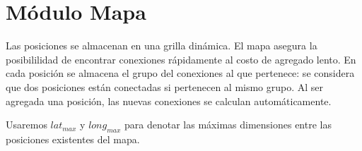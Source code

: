 \newcommand\compmatriz{lat_{max} \times long_{max}}

\section{Módulo Mapa}

Las posiciones se almacenan en una grilla dinámica.
El mapa asegura la posibililidad de encontrar conexiones rápidamente al costo de agregado lento. En cada posición se almacena el grupo del conexiones al que pertenece: se considera que dos posiciones están conectadas si pertenecen al mismo grupo. Al ser agregada una posición, las nuevas conexiones se calculan automáticamente.

Usaremos $lat_{max}$ y $long_{max}$ para denotar las máximas dimensiones entre las posiciones existentes del mapa.

